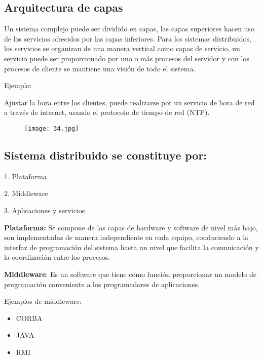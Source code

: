 \begin{center}
\subsection{Arquitectura de capas}
\end{center}

Un sistema complejo puede ser dividido en capas, las capas superiores hacen uso de los servicios ofrecidos por las capas inferiores. Para los sistemas distribuidos, los servicios se organizan de una manera vertical como capas de servicio, un servicio puede ser proporcionado por uno o más procesos del servidor y con los procesos de cliente se mantiene una visión de todo el sistema.\hfill \break

Ejemplo:

Ajustar la hora entre los clientes, puede realizarse por un servicio de hora de red a través de internet, usando el protocolo de tiempo de red (NTP).

\begin{figure}[h!]
		\centering
		{\texttt{[image: 34.jpg]}\par} \vspace{1cm}
\end{figure}

{\raggedright
\subsection{Sistema distribuido se constituye por:}
}

1. Plataforma

2. Middleware

3. Aplicaciones y servicios\hfill \break

\textbf{Plataforma: }Se compone de las capas de hardware y software de nivel más bajo, son implementadas de manera independiente en cada equipo, conduciendo a la interfaz de programación del sistema hasta un nivel que facilita la comunicación y la coordinación entre los procesos.

\textbf{Middleware}: Es un software que tiene como función proporcionar un modelo de programación conveniente a los programadores de aplicaciones.

Ejemplos de middleware: 

\begin{itemize}
	\item CORBA
	\item JAVA
	\item RMI
\end{itemize}

